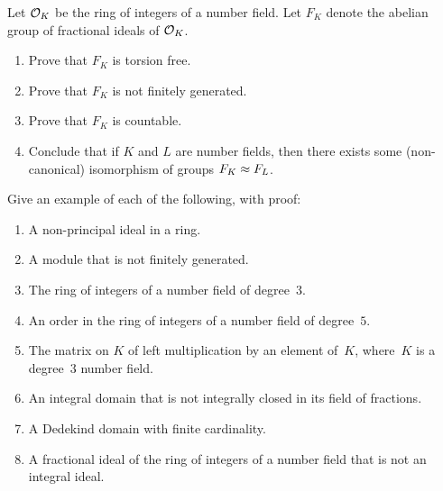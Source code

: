 \begin{example}
%

\end{example}

\begin{exercise}
	Let $\mathcal{O}_K$ be the ring of integers of a number field.
	Let $F_K$ denote the abelian group of fractional ideals of $\mathcal{O}_K$.
	\begin{enumerate}
		\item Prove that $F_K$ is torsion free.
		\item Prove that $F_K$ is not finitely generated.
		\item Prove that $F_K$ is countable.
		\item Conclude that if $K$ and $L$ are number fields, then there
		exists some (non-canonical) isomorphism of groups $F_K\approx F_L$.
	\end{enumerate}
\end{exercise}

\begin{exercise}
	Give an example of each of the following, with proof:
	\begin{enumerate}
		\item A non-principal ideal in a ring.
		\item A module that is not finitely generated.
		\item The ring of integers of a number field of degree~$3$.
		\item An order in the ring of integers of a number field of degree~$5$.
		\item The matrix on $K$ of left multiplication by an element of~$K$,
		where~$K$ is a degree~$3$ number field.
		\item An integral domain that is not integrally closed in its field
		of fractions.
		\item A Dedekind domain with finite cardinality.
		\item A fractional ideal of the ring of integers of a number
		field that is not an integral ideal.
	\end{enumerate}
\end{exercise}
